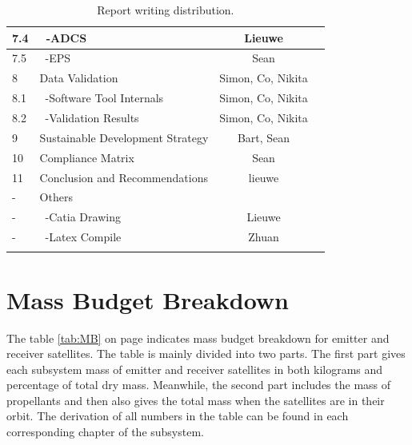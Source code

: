 \begin{center}
\begin{longtable}{|l|l|c|c|}
 7.4     & \ -ADCS                              & Lieuwe &\\\hline
 7.5     & \ -EPS                               & Sean &\\\hline
 8       & Data Validation                      & Simon, Co, Nikita &\\\hline
 8.1     & \ -Software Tool Internals           & Simon, Co, Nikita &\\\hline
 8.2     & \ -Validation Results                & Simon, Co, Nikita &\\\hline
 9       & Sustainable Development Strategy     &Bart, Sean &\\\hline
 10      & Compliance Matrix                    & Sean &\\\hline\hline
 11      & Conclusion and Recommendations       & lieuwe &\\\hline\hline
 -       & Others                               &&\\\hline
 -       & \ -Catia Drawing                     & Lieuwe &\\\hline
 -       & \ -Latex Compile                     & Zhuan &\\\hline

\caption{Report writing distribution.}
\label{tab:RWD}
\end{longtable}
\end{center}

\section{Mass Budget Breakdown}
\label{DDMBB}
The table \ref{tab:MB} on page \pageref{tab:MB} indicates mass budget breakdown for emitter and receiver satellites. The table is mainly divided into two parts. The first part gives each subsystem mass of emitter and receiver satellites in both kilograms and percentage of total dry mass. Meanwhile, the second part includes the mass of propellants and then also gives the total mass when the satellites are in their orbit. The derivation of all numbers in the table can be found in each corresponding chapter of the subsystem.

